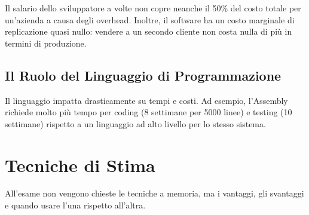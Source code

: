 \begin{notaprof}
Il salario dello sviluppatore a volte non copre neanche il 50\% del costo totale per un'azienda a causa degli overhead. Inoltre, il software ha un costo marginale di replicazione quasi nullo: vendere a un secondo cliente non costa nulla di più in termini di produzione.
\end{notaprof}

\subsection{Il Ruolo del Linguaggio di Programmazione}
\begin{notaslide}
Il linguaggio impatta drasticamente su tempi e costi. Ad esempio, l'Assembly richiede molto più tempo per coding (8 settimane per 5000 linee) e testing (10 settimane) rispetto a un linguaggio ad alto livello per lo stesso sistema.
\end{notaslide}

\section{Tecniche di Stima}
\begin{notaesame}
All'esame non vengono chieste le tecniche a memoria, ma i vantaggi, gli svantaggi e quando usare l'una rispetto all'altra.
\end{notaesame}

